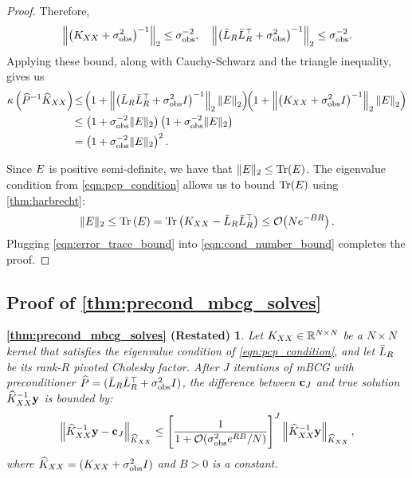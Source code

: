 \begin{proof}
  Therefore,
  \[
    \left\Vert \left(K_{XX} + \sigma^2_\text{obs} \right)^{-1} \right\Vert_2 \leq \sigma^{-2}_\text{obs},
    \quad
    \left\Vert \left(\bar{L}_R \bar{L}_R^\top + \sigma^2_\text{obs} \right)^{-1} \right\Vert_2 \leq \sigma^{-2}_\text{obs}.
  \]
  Applying these bound, along with Cauchy-Schwarz and the triangle inequality, gives us
  \begin{align}
    \kappa \left( \widehat{P}^{-1}\widehat{K}_{XX} \right) \!
    &\leq \! \left( 1 + \left\Vert \left( \bar{L}_R \bar{L}_R^\top + \sigma^2_\text{obs} I \right)^{-1} \right\Vert_2 \left\Vert E \right\Vert_{2} \right)
      \!\!
      \left( 1 + \left\Vert \left( K_{XX} + \sigma^2_\text{obs} I \right)^{-1} \right\Vert_2 \left\Vert E \right\Vert_{2} \right)
    \nonumber \\
    &\leq
    \left( 1 + \sigma^{-2}_\text{obs} \Vert E \Vert_2 \right)
    \left( 1 + \sigma^{-2}_\text{obs} \Vert E \Vert_2 \right)
    \nonumber \\
    &= \left( 1 + \sigma^{-2}_\text{obs} \Vert E \Vert_2 \right)^2.
    \label{eqn:cond_number_bound}
  \end{align}

  Since $E$ is positive semi-definite, we have that $\Vert \bE \Vert_2 \leq \tr{\bE}$.
  The eigenvalue condition from \cref{eqn:pcp_condition} allows us to bound $\tr{\bE}$ using \cref{thm:harbrecht}:
  \begin{equation}
    \Vert \bE \Vert_2 \leq \tr{\bE}
    =
    \tr{ \bK_{\bX\bX} - \bar\bL_R \bar\bL_R^\top } \leq \bigo{N e^{-BR}}.
    \label{eqn:error_trace_bound}
  \end{equation}
  Plugging \cref{eqn:error_trace_bound} into \cref{eqn:cond_number_bound} completes the proof.
\end{proof}




\subsection{Proof of \cref{thm:precond_mbcg_solves}}
\newtheorem*{thm:precond_mbcg_solves}{\cref{thm:precond_mbcg_solves} (Restated)}
\begin{thm:precond_mbcg_solves}
  Let $K_{XX} \in \mathbb{R}^{N \times N}$ be a $N \times N$ kernel that satisfies the eigenvalue condition of \cref{eqn:pcp_condition},
	and let $\bar{L}_R$ be its rank-$R$ pivoted Cholesky factor.
	After $J$ iterations of mBCG with preconditioner $\widehat{P} = (\bar{L}_R \bar{L}_R^\top + \sigma_\text{obs}^2 I)$,
	the difference between $\mathbf{c}_J$ and true solution $\widehat{K}_{XX}^{-1} \mathbf{y}$ is bounded by:
  \begin{equation*}
    \left \Vert \trainK^{-1} \by - \bc_{J} \right \Vert_{\trainK}
    \leq \Bigg[ \frac 1 {1 + \bigo{\sigma^{2}_\text{obs} e^{RB}/N}} \Bigg]^{J}
    \left \Vert \trainK^{-1} \by \right \Vert_{\trainK},
		\nonumber
  \end{equation*}
	where $\widehat{K}_{XX} = (K_{XX} + \sigma^2_\text{obs} I)$ and $B > 0$ is a constant.
\end{thm:precond_mbcg_solves}

